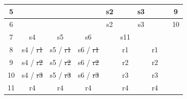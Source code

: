 \begin{table}[!h]
{\begin{tabular}{|cccccccccc|}
			\multicolumn{1}{|c|}{5} &
			\multicolumn{1}{c|}{} &
			\multicolumn{1}{c|}{} &
			\multicolumn{1}{c|}{} &
			\multicolumn{1}{c|}{s2} &
			\multicolumn{1}{c|}{} &
			\multicolumn{1}{c|}{s3} &
			\multicolumn{1}{c|}{} &
			\multicolumn{1}{c|}{} &
			9 \\ \hline
			\multicolumn{1}{|c|}{6} &
			\multicolumn{1}{c|}{} &
			\multicolumn{1}{c|}{} &
			\multicolumn{1}{c|}{} &
			\multicolumn{1}{c|}{s2} &
			\multicolumn{1}{c|}{} &
			\multicolumn{1}{c|}{s3} &
			\multicolumn{1}{c|}{} &
			\multicolumn{1}{c|}{} &
			10 \\ \hline
			\multicolumn{1}{|c|}{7} &
			\multicolumn{1}{c|}{s4} &
			\multicolumn{1}{c|}{s5} &
			\multicolumn{1}{c|}{s6} &
			\multicolumn{1}{c|}{} &
			\multicolumn{1}{c|}{s11} &
			\multicolumn{1}{c|}{} &
			\multicolumn{1}{c|}{} &
			\multicolumn{1}{c|}{} &
			\\ \hline
			\multicolumn{1}{|c|}{8} &
			\multicolumn{1}{c|}{\cellcolor[HTML]{FFC0CB}s4 / \sout{r1}} &
			\multicolumn{1}{c|}{\cellcolor[HTML]{FFC0CB}s5 / \sout{r1}} &
			\multicolumn{1}{c|}{\cellcolor[HTML]{FFC0CB}s6 / \sout{r1}} &
			\multicolumn{1}{c|}{} &
			\multicolumn{1}{c|}{r1} &
			\multicolumn{1}{c|}{} &
			\multicolumn{1}{c|}{r1} &
			\multicolumn{1}{c|}{} &
			\\ \hline
			\multicolumn{1}{|c|}{9} &
			\multicolumn{1}{c|}{\cellcolor[HTML]{FFC0CB}s4 / \sout{r2}} &
			\multicolumn{1}{c|}{\cellcolor[HTML]{FFC0CB}s5 / \sout{r2}} &
			\multicolumn{1}{c|}{\cellcolor[HTML]{FFC0CB}s6 / \sout{r2}} &
			\multicolumn{1}{c|}{} &
			\multicolumn{1}{c|}{r2} &
			\multicolumn{1}{c|}{} &
			\multicolumn{1}{c|}{r2} &
			\multicolumn{1}{c|}{} &
			\\ \hline
			\multicolumn{1}{|c|}{10} &
			\multicolumn{1}{c|}{\cellcolor[HTML]{FFC0CB}s4 / \sout{r3}} &
			\multicolumn{1}{c|}{\cellcolor[HTML]{FFC0CB}s5 / \sout{r3}} &
			\multicolumn{1}{c|}{\cellcolor[HTML]{FFC0CB}s6 / \sout{r3}} &
			\multicolumn{1}{c|}{} &
			\multicolumn{1}{c|}{r3} &
			\multicolumn{1}{c|}{} &
			\multicolumn{1}{c|}{r3} &
			\multicolumn{1}{c|}{} &
			\\ \hline
			\multicolumn{1}{|c|}{11} &
			\multicolumn{1}{c|}{r4} &
			\multicolumn{1}{c|}{r4} &
			\multicolumn{1}{c|}{r4} &
			\multicolumn{1}{c|}{} &
			\multicolumn{1}{c|}{r4} &
			\multicolumn{1}{c|}{} &
			\multicolumn{1}{c|}{r4} &
			\multicolumn{1}{c|}{} &
			\\ \hline
		\end{tabular}%
	}
\end{table}


